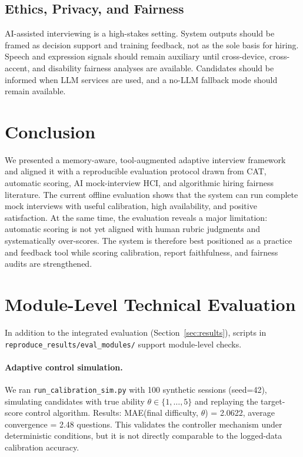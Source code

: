 ﻿\documentclass[final,3p,times,authoryear]{elsarticle}
\begin{document}
\subsection{Ethics, Privacy, and Fairness}

\noindent AI-assisted interviewing is a high-stakes setting. System outputs should be framed as decision support and training feedback, not as the sole basis for hiring. Speech and expression signals should remain auxiliary until cross-device, cross-accent, and disability fairness analyses are available. Candidates should be informed when LLM services are used, and a no-LLM fallback mode should remain available.

\section{Conclusion}
\label{sec:conclusion}

\noindent We presented a memory-aware, tool-augmented adaptive interview framework and aligned it with a reproducible evaluation protocol drawn from CAT, automatic scoring, AI mock-interview HCI, and algorithmic hiring fairness literature. The current offline evaluation shows that the system can run complete mock interviews with useful calibration, high availability, and positive satisfaction. At the same time, the evaluation reveals a major limitation: automatic scoring is not yet aligned with human rubric judgments and systematically over-scores. The system is therefore best positioned as a practice and feedback tool while scoring calibration, report faithfulness, and fairness audits are strengthened.

\appendix
\section{Module-Level Technical Evaluation}
\label{app:module_eval}

\noindent In addition to the integrated evaluation (Section~\ref{sec:results}), scripts in \texttt{reproduce\_results/eval\_modules/} support module-level checks.

\paragraph{Adaptive control simulation.} We ran \texttt{run\_calibration\_sim.py} with 100 synthetic sessions (seed=42), simulating candidates with true ability $\theta \in \{1,\ldots,5\}$ and replaying the target-score control algorithm. Results: MAE(final difficulty, $\theta$) = 2.0622, average convergence = 2.48 questions. This validates the controller mechanism under deterministic conditions, but it is not directly comparable to the logged-data calibration accuracy.
\end{document}
